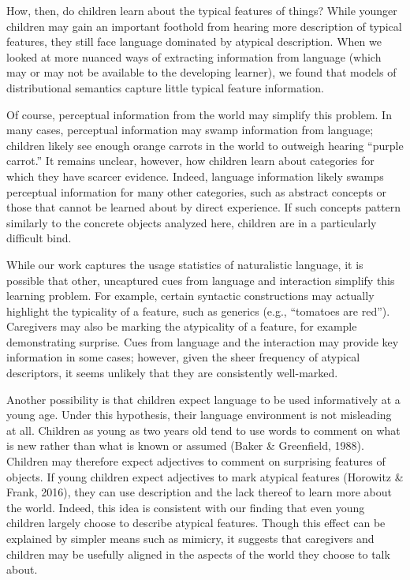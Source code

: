 \documentclass[10pt, letterpaper]{article}
\begin{document}
How, then, do children learn about the typical features of things? While
younger children may gain an important foothold from hearing more
description of typical features, they still face language dominated by
atypical description. When we looked at more nuanced ways of extracting
information from language (which may or may not be available to the
developing learner), we found that models of distributional semantics
capture little typical feature information.

Of course, perceptual information from the world may simplify this
problem. In many cases, perceptual information may swamp information
from language; children likely see enough orange carrots in the world to
outweigh hearing ``purple carrot.'' It remains unclear, however, how
children learn about categories for which they have scarcer evidence.
Indeed, language information likely swamps perceptual information for
many other categories, such as abstract concepts or those that cannot be
learned about by direct experience. If such concepts pattern similarly
to the concrete objects analyzed here, children are in a particularly
difficult bind.

While our work captures the usage statistics of naturalistic language,
it is possible that other, uncaptured cues from language and interaction
simplify this learning problem. For example, certain syntactic
constructions may actually highlight the typicality of a feature, such
as generics (e.g., ``tomatoes are red''). Caregivers may also be marking
the atypicality of a feature, for example demonstrating surprise. Cues
from language and the interaction may provide key information in some
cases; however, given the sheer frequency of atypical descriptors, it
seems unlikely that they are consistently well-marked.

Another possibility is that children expect language to be used
informatively at a young age. Under this hypothesis, their language
environment is not misleading at all. Children as young as two years old
tend to use words to comment on what is new rather than what is known or
assumed (Baker \& Greenfield, 1988). Children may therefore expect
adjectives to comment on surprising features of objects. If young
children expect adjectives to mark atypical features (Horowitz \& Frank,
2016), they can use description and the lack thereof to learn more about
the world. Indeed, this idea is consistent with our finding that even
young children largely choose to describe atypical features. Though this
effect can be explained by simpler means such as mimicry, it suggests
that caregivers and children may be usefully aligned in the aspects of
the world they choose to talk about.
\end{document}
